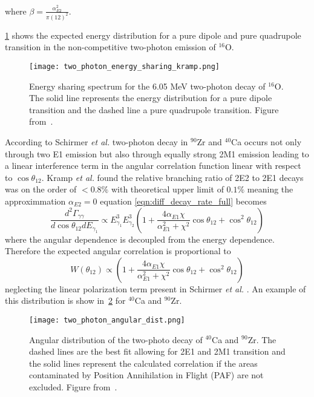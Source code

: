 \documentclass[cnatzke_thesis_proposal.tex]{subfiles}
\begin{document}
where $\beta = \frac{\alpha_{E2}^2}{\pi (12)^2}$.

\ref{fig:two_photon_energy_sharing_kramp} shows the expected energy distribution for a pure dipole and pure quadrupole transition in the non-competitive two-photon emission of $^{16}$O.

\begin{figure}[htbp]
    \centering
    \texttt{[image: two\_photon\_energy\_sharing\_kramp.png]}
    \caption{Energy sharing spectrum for the 6.05 MeV two-photon decay of $^{16}$O. The solid line represents the energy distribution for a pure dipole transition and the dashed line a pure quadrupole transition. Figure from~\cite{kramp_nuclear_1987}.}
    \label{fig:two_photon_energy_sharing_kramp}
\end{figure}
  
According to Schirmer \textit{et al.} two-photon decay in $^{90}$Zr and $^{40}$Ca occurs not only through two E1 emission but also through equally strong 2M1 emission leading to a linear interference term in the angular correlation function linear with respect to $\cos\theta_{12}$. 
Kramp \textit{et al.} found the relative branching ratio of 2E2 to 2E1 decays was on the order of $<0.8\%$ with theoretical upper limit of $0.1\%$ meaning the approximmation $\alpha_{E2} = 0$ equation \ref{eqn:diff_decay_rate_full} becomes 
\begin{equation}
    \frac{d^2\Gamma_{\gamma\gamma}}{d \cos\theta_{12} dE_{\gamma_1}} \propto E_{\gamma_1}^3 E_{\gamma_2}^3 \left( 1 + \frac{4 \alpha_{E1} \chi}{\alpha_{E1}^2 + \chi^2} \cos\theta_{12} +  \cos^2\theta_{12} \right)
\end{equation}
where the angular dependence is decoupled from the energy dependence. Therefore the expected angular correlation is proportional to
\begin{equation} \label{eqn:angular-distribution}
   W(\theta_{12}) \propto \left( 1 + \frac{4 \alpha_{E1} \chi}{\alpha_{E1}^2 + \chi^2} \cos\theta_{12} +  \cos^2\theta_{12} \right)
\end{equation}
neglecting the linear polarization term present in Schirmer \textit{et al.} \cite{schirmer_double_1984}.
An example of this distribution is show in~\ref{fig:two_photon_angular_dist} for $^{40}$Ca and $^{90}$Zr.

\begin{figure}[htbp]
    \centering
    \texttt{[image: two\_photon\_angular\_dist.png]}
    \caption{Angular distribution of the two-photo decay of $^{40}$Ca and $^{90}$Zr. The dashed lines are the best fit allowing for 2E1 and 2M1 transition and the solid lines represent the calculated correlation if the areas contaminated by Position Annihilation in Flight (PAF) are not excluded. Figure from~\cite{schirmer_double_1984}.}
    \label{fig:two_photon_angular_dist}
\end{figure}
\end{document}
